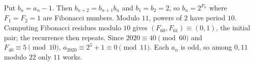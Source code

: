 Put $b_n=a_n-1$. Then $b_{n+2}=b_{n+1}b_n$ and $b_1=b_2=2$, so $b_n=2^{F_n}$ where $F_1=F_2=1$ are Fibonacci numbers. Modulo $11$, powers of $2$ have period $10$. Computing Fibonacci residues modulo $10$ gives $(F_{60},F_{61})\equiv(0,1)$, the initial pair; the recurrence then repeats. Since $2020\equiv40\pmod{60}$ and $F_{40}\equiv5\pmod{10}$, $a_{2020}\equiv2^5+1\equiv0\pmod{11}$. Each $a_n$ is odd, so among $0,11$ modulo $22$ only $\boxed{11}$ works.
